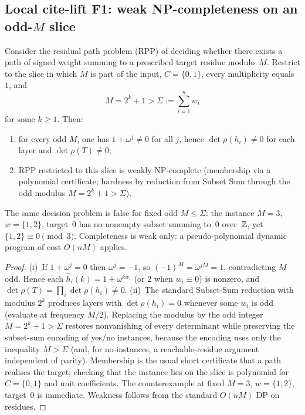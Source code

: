 \subsection{Local cite-lift F1: weak NP-completeness on an odd-$M$ slice}
\begin{theorem}\label{thm:local-F1}
Consider the residual path problem (RPP) of deciding whether there exists a path of signed weight summing to a prescribed target residue modulo~$M$. Restrict to the slice in which $M$ is part of the input, $C=\{0,1\}$, every multiplicity equals~$1$, and
\[
M=2^k+1>\Sigma:=\sum_{i=1}^n w_i
\]
for some $k\ge1$. Then:
\begin{enumerate}[label=(\roman*)]
\item for every odd $M$, one has $1+\omega^j\neq0$ for all $j$, hence $\det\rho(h_i)\neq0$ for each layer and $\det\rho(T)\neq0$;
\item RPP restricted to this slice is weakly NP-complete (membership via a polynomial certificate; hardness by reduction from Subset Sum through the odd modulus $M=2^k+1>\Sigma$).
\end{enumerate}
The same decision problem is false for fixed odd $M\le\Sigma$: the instance $M=3$, $w=\{1,2\}$, target~$0$ has no nonempty subset summing to~$0$ over~$\mathbb{Z}$, yet $\{1,2\}\equiv0\pmod3$. Completeness is weak only: a pseudo-polynomial dynamic program of cost $O(nM)$ applies.
\end{theorem}
\begin{proof}
(i)~If $1+\omega^j=0$ then $\omega^j=-1$, so $(-1)^M=\omega^{jM}=1$, contradicting $M$ odd. Hence each $\hat h_i(k)=1+\omega^{k w_i}$ (or $2$ when $w_i\equiv0$) is nonzero, and $\det\rho(T)=\prod_i\det\rho(h_i)\neq0$. (ii)~The standard Subset-Sum reduction with modulus $2^k$ produces layers with $\det\rho(h_i)=0$ whenever some $w_i$ is odd (evaluate at frequency $M/2$). Replacing the modulus by the odd integer $M=2^k+1>\Sigma$ restores nonvanishing of every determinant while preserving the subset-sum encoding of yes/no instances, because the encoding uses only the inequality $M>\Sigma$ (and, for no-instances, a reachable-residue argument independent of parity). Membership is the usual short certificate that a path realises the target; checking that the instance lies on the slice is polynomial for $C=\{0,1\}$ and unit coefficients. The counterexample at fixed $M=3$, $w=\{1,2\}$, target~$0$ is immediate. Weakness follows from the standard $O(nM)$ DP on residues.
\end{proof}

